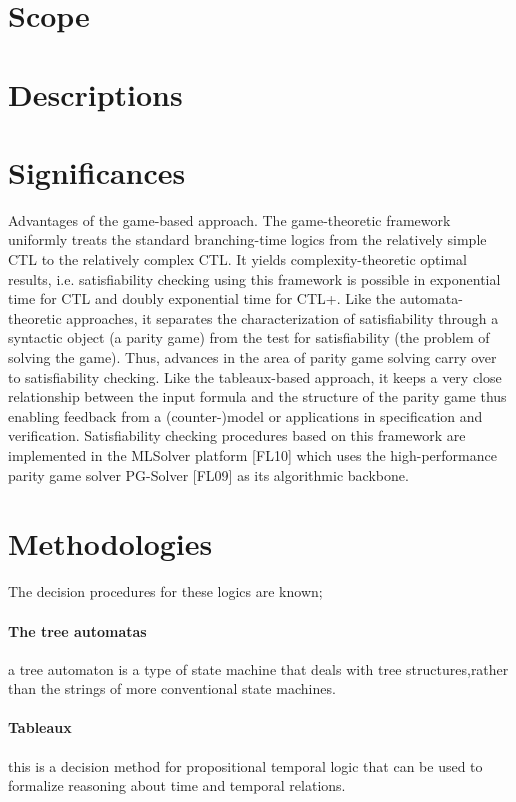 \documentclass[12pt,letterpaper]{article}
\begin{document}
{\section{Scope}
\section{Descriptions}
\section{Significances}
Advantages of the game-based approach. The game-theoretic framework uniformly treats the standard branching-time logics from the relatively simple CTL to the relatively complex CTL.
 It yields complexity-theoretic optimal results, i.e. satisfiability checking using this framework
is possible in exponential time for CTL and doubly exponential time for CTL+.
 Like the automata-theoretic approaches, it separates the characterization of satisfiability
through a syntactic object (a parity game) from the test for satisfiability (the problem
of solving the game). Thus, advances in the area of parity game solving carry over to
satisfiability checking. Like the tableaux-based approach, it keeps a very close relationship between the input formula and the structure of the parity game thus enabling feedback from a (counter-)model or applications in specification and verification. Satisfiability checking procedures based on this framework are implemented in the
MLSolver platform [FL10] which uses the high-performance parity game solver PG-Solver [FL09] as its algorithmic backbone.

\section{Methodologies}
The decision procedures for these logics are known;
\paragraph{ The tree automatas}
	a tree automaton is a type of state machine that deals with tree structures,rather than the strings of more conventional state machines.
\paragraph{ Tableaux}
	this is a decision method for propositional temporal logic that can be used to formalize reasoning about time and temporal relations.
}
\end{document}
